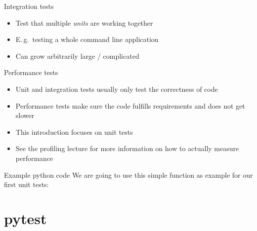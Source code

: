 \begin{frame}[c]{Integration tests}
  \begin{itemize}
    \item Test that multiple \emph{units} are working together
    \item E.\,g.\ testing a whole command line application
    \item Can grow arbitrarily large / complicated
  \end{itemize}
\end{frame}

\begin{frame}[c]{Performance tests}
  \begin{itemize}
    \item Unit and integration tests usually only test the correctness of code
    \item Performance tests make sure the code fulfills requirements and does not get slower
    \item This introduction focuses on unit tests
    \item See the profiling lecture for more information on how to actually measure performance
  \end{itemize}
\end{frame}

\begin{frame}[c, fragile]{Example python code}
  We are going to use this simple function as example for our first unit tests:
\end{frame}

\section{pytest}

